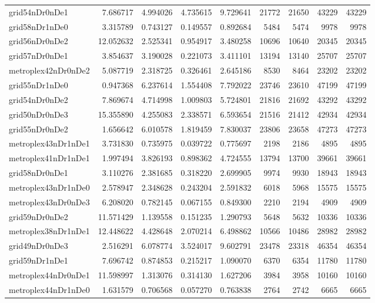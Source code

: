 \begin{longtable}{|l|r|r|r|r|r|r|r|r|}
grid54nDr0nDe1 & 7.686717 & 4.994026 & 4.735615 & 9.729641 & 21772 & 21650 & 43229 & 43229 \\
grid58nDr1nDe0 & 3.315789 & 0.743127 & 0.149557 & 0.892684 & 5484 & 5474 & 9978 & 9978 \\
grid56nDr0nDe2 & 12.052632 & 2.525341 & 0.954917 & 3.480258 & 10696 & 10640 & 20345 & 20345 \\
grid57nDr0nDe1 & 3.854637 & 3.190028 & 0.221073 & 3.411101 & 13194 & 13140 & 25707 & 25707 \\
metroplex42nDr0nDe2 & 5.087719 & 2.318725 & 0.326461 & 2.645186 & 8530 & 8464 & 23202 & 23202 \\
grid55nDr1nDe0 & 0.947368 & 6.237614 & 1.554408 & 7.792022 & 23746 & 23610 & 47199 & 47199 \\
grid54nDr0nDe2 & 7.869674 & 4.714998 & 1.009803 & 5.724801 & 21816 & 21692 & 43292 & 43292 \\
grid50nDr0nDe3 & 15.355890 & 4.255083 & 2.338571 & 6.593654 & 21516 & 21412 & 42934 & 42934 \\
grid55nDr0nDe2 & 1.656642 & 6.010578 & 1.819459 & 7.830037 & 23806 & 23658 & 47273 & 47273 \\
metroplex43nDr1nDe1 & 3.731830 & 0.735975 & 0.039722 & 0.775697 & 2198 & 2186 & 4895 & 4895 \\
metroplex41nDr1nDe1 & 1.997494 & 3.826193 & 0.898362 & 4.724555 & 13794 & 13700 & 39661 & 39661 \\
grid58nDr0nDe1 & 3.110276 & 2.381685 & 0.318220 & 2.699905 & 9974 & 9930 & 18943 & 18943 \\
metroplex43nDr1nDe0 & 2.578947 & 2.348628 & 0.243204 & 2.591832 & 6018 & 5968 & 15575 & 15575 \\
metroplex43nDr0nDe3 & 6.208020 & 0.782145 & 0.067155 & 0.849300 & 2210 & 2194 & 4909 & 4909 \\
grid59nDr0nDe2 & 11.571429 & 1.139558 & 0.151235 & 1.290793 & 5648 & 5632 & 10336 & 10336 \\
metroplex38nDr1nDe1 & 12.448622 & 4.428648 & 2.070214 & 6.498862 & 10566 & 10486 & 28982 & 28982 \\
grid49nDr0nDe3 & 2.516291 & 6.078774 & 3.524017 & 9.602791 & 23478 & 23318 & 46354 & 46354 \\
grid59nDr1nDe1 & 7.696742 & 0.874853 & 0.215217 & 1.090070 & 6370 & 6354 & 11780 & 11780 \\
metroplex44nDr0nDe1 & 11.598997 & 1.313076 & 0.314130 & 1.627206 & 3984 & 3958 & 10160 & 10160 \\
metroplex44nDr1nDe0 & 1.631579 & 0.706568 & 0.057270 & 0.763838 & 2764 & 2742 & 6665 & 6665 \\

\end{longtable}
